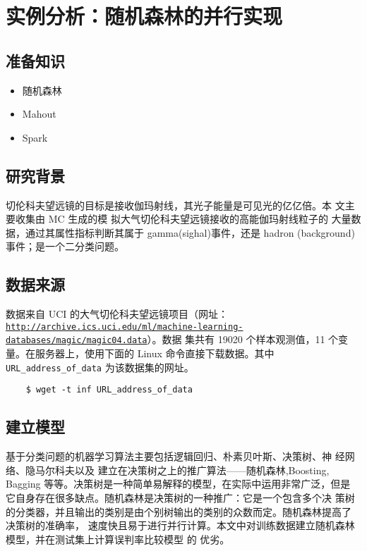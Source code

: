 \section{实例分析：随机森林的并行实现}\label{ux5b9eux4f8bux5206ux6790ux968fux673aux68eeux6797ux7684ux5e76ux884cux5b9eux73b0}

\subsection{准备知识}\label{ux51c6ux5907ux77e5ux8bc6}

\begin{itemize}
\itemsep1pt\parskip0pt
\item
  随机森林
\item
  Mahout
\item
  Spark
\end{itemize}

\subsection{研究背景}\label{ux7814ux7a76ux80ccux666f}

切伦科夫望远镜的目标是接收伽玛射线，其光子能量是可见光的亿亿倍。本
文主要收集由 MC 生成的模 拟大气切伦科夫望远镜接收的高能伽玛射线粒子的
大量数据，通过其属性指标判断其属于 gamma(sighal)事件，还是 hadron
(background)事件；是一个二分类问题。

\subsection{数据来源}\label{ux6570ux636eux6765ux6e90}

数据来自 UCI 的大气切伦科夫望远镜项目（网址：
\href{http://archive.ics.uci.edu/ml/machine-learning-databases/magic/magic04.data}{\lstinline|http://archive.ics.uci.edu/ml/machine-learning-databases/magic/magic04.data|}）。数据
集共有 19020 个样本观测值，11 个变量。在服务器上，使用下面的 Linux
命令直接下载数据。其中 \texttt{URL\_address\_of\_data} 为该数据集的网址。

\begin{lstlisting}
	$ wget -t inf URL_address_of_data
\end{lstlisting}

\subsection{建立模型}\label{ux5efaux7acbux6a21ux578b}

基于分类问题的机器学习算法主要包括逻辑回归、朴素贝叶斯、决策树、神
经网络、隐马尔科夫以及
建立在决策树之上的推广算法------随机森林,Boosting, Bagging
等等。决策树是一种简单易解释的模型，在实际中运用非常广泛，但是
它自身存在很多缺点。随机森林是决策树的一种推广：它是一个包含多个决
策树的分类器，并且输出的类别是由个别树输出的类别的众数而定。随机森林提高了
决策树的准确率，
速度快且易于进行并行计算。本文中对训练数据建立随机森林模型，并在测试集上计算误判率比较模型
的 优劣。

